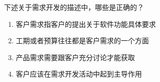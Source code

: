 \begin{problem}
	下述关于需求开发的描述中，哪些是正确的？
    \vspace{-0.8em}
    \begin{multicols}{2}
        \begin{enumerate}[label=\Alph*.]
            \item 客户需求指客户的提出关于软件功能具体要求
            \item 工期或者预算往往都是客户需求的一个方面
            \item 产品需求需要跟客户充分讨论才能获取
            \item 客户应该在需求开发活动中起到主导作用
        \end{enumerate}
    \end{multicols}
    \vspace{-1em}
\end{problem}
